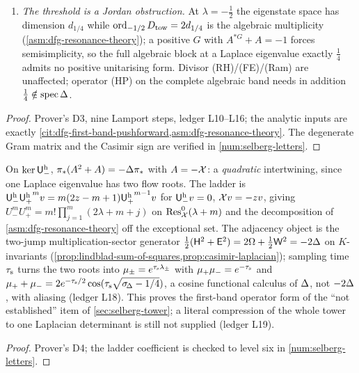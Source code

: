 \begin{theorem}
\begin{enumerate}
ledger L14); on the odd Selberg generator $S = -\gflow+1$, $JSJ^{-1} = 1-S$.
\item[(iv)] \emph{The threshold is a Jordan obstruction.} At $\lambda = -\tfrac12$ the eigenstate
space has dimension $d_{1/4}$ while $\operatorname{ord}_{-1/2}D_{\mathrm{tow}} = 2d_{1/4}$ is the algebraic
multiplicity (\cref{asm:dfg-resonance-theory}); a positive $G$ with $A^{*G}+A = -1$ forces
semisimplicity, so the full algebraic block at a Laplace eigenvalue exactly $\tfrac14$ admits no
positive unitarising form. Divisor (RH)/(FE)/(Ram) are unaffected; operator (HP) on the complete
algebraic band needs in addition $\tfrac14\notin\operatorname{spec}\Delta$.
\end{enumerate}
\end{theorem}
\begin{proof}
Prover's D3, nine Lamport steps, ledger L10--L16; the analytic inputs are exactly
\cref{cit:dfg-first-band-pushforward,asm:dfg-resonance-theory}. The degenerate Gram matrix and the
Casimir sign are verified in \cref{num:selberg-letters}.
\end{proof}

\begin{proposition}
\label{prop:selberg-ladder-ihara}
On $\ker{\mathsf U^{\mathrm h}_{-}}$, $\pi_*(A^2+A) = -\Delta\pi_*$ with $A = -\mathcal X$: a \emph{quadratic}
intertwining, since one Laplace eigenvalue has two flow roots. The ladder is
${\mathsf U^{\mathrm h}_{-}}{\mathsf U^{\mathrm h}_{+}}^mv = m(2z-m+1){\mathsf U^{\mathrm h}_{+}}^{m-1}v$ for ${\mathsf U^{\mathrm h}_{-}}v = 0$, $\mathcal X v = -zv$, giving
$U_-^mU_+^m = m!\prod_{j=1}^m(2\lambda+m+j)$ on $\operatorname{Res}^0_{\mathcal X}(\lambda+m)$ and the decomposition of
\cref{asm:dfg-resonance-theory} off the exceptional set. The adjacency object is the two-jump
multiplication-sector generator $\tfrac12(\mathsf H^2+\mathsf E^2) = 2\Omega+\tfrac12\mathsf W^2 = -2\Delta$ on
$K$-invariants (\cref{prop:lindblad-sum-of-squares,prop:casimir-laplacian}); sampling time $\tau_{\mathrm{s}}$
turns the two roots into $\mu_\pm = e^{\tau_{\mathrm{s}}\lambda_\pm}$ with $\mu_+\mu_- = e^{-\tau_{\mathrm{s}}}$ and
$\mu_++\mu_- = 2e^{-\tau_{\mathrm{s}}/2}\cos(\tau_{\mathrm{s}}\sqrt{\sigma_{\!\Delta}-1/4})$, a cosine functional calculus of $\Delta$,
not $-2\Delta$, with aliasing (ledger L18). This proves the first-band operator form of the
``not established'' item of \cref{sec:selberg-tower}; a literal compression of the whole tower to
one Laplacian determinant is still not supplied (ledger L19).
\end{proposition}
\begin{proof}
Prover's D4; the ladder coefficient is checked to level six in \cref{num:selberg-letters}.
\end{proof}

